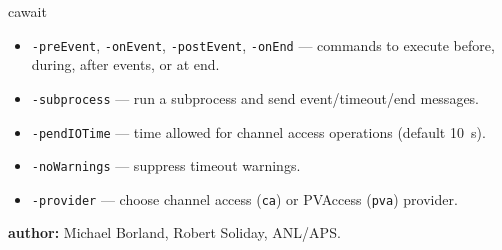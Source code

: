 \begin{sddsprog}{cawait}
\begin{itemize}
  \item {\tt -preEvent}, {\tt -onEvent}, {\tt -postEvent}, {\tt -onEnd} --- commands to execute before, during, after events, or at end.
  \item {\tt -subprocess} --- run a subprocess and send event/timeout/end messages.
  \item {\tt -pendIOTime} --- time allowed for channel access operations (default 10~s).
  \item {\tt -noWarnings} --- suppress timeout warnings.
  \item {\tt -provider} --- choose channel access ({\tt ca}) or PVAccess ({\tt pva}) provider.
\end{itemize}
\item \textbf{author:} Michael Borland, Robert Soliday, ANL/APS.
\end{sddsprog}

